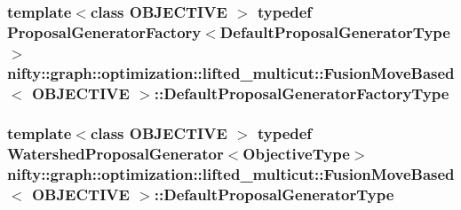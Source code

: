 \subsubsection[{Default\+Proposal\+Generator\+Factory\+Type}]{\setlength{\rightskip}{0pt plus 5cm}template$<$class O\+B\+J\+E\+C\+T\+I\+V\+E $>$ typedef {\bf Proposal\+Generator\+Factory}$<${\bf Default\+Proposal\+Generator\+Type}$>$ {\bf nifty\+::graph\+::optimization\+::lifted\+\_\+multicut\+::\+Fusion\+Move\+Based}$<$ O\+B\+J\+E\+C\+T\+I\+V\+E $>$\+::{\bf Default\+Proposal\+Generator\+Factory\+Type}}\label{classnifty_1_1graph_1_1optimization_1_1lifted__multicut_1_1FusionMoveBased_abf6ee046e4b736c29bcec411b6d71aaa}
\hypertarget{classnifty_1_1graph_1_1optimization_1_1lifted__multicut_1_1FusionMoveBased_ad26cd7774a1de503680faae6fdf0bc1f}{}
\subsubsection[{Default\+Proposal\+Generator\+Type}]{\setlength{\rightskip}{0pt plus 5cm}template$<$class O\+B\+J\+E\+C\+T\+I\+V\+E $>$ typedef {\bf Watershed\+Proposal\+Generator}$<${\bf Objective\+Type}$>$ {\bf nifty\+::graph\+::optimization\+::lifted\+\_\+multicut\+::\+Fusion\+Move\+Based}$<$ O\+B\+J\+E\+C\+T\+I\+V\+E $>$\+::{\bf Default\+Proposal\+Generator\+Type}}\label{classnifty_1_1graph_1_1optimization_1_1lifted__multicut_1_1FusionMoveBased_ad26cd7774a1de503680faae6fdf0bc1f}
\hypertarget{classnifty_1_1graph_1_1optimization_1_1lifted__multicut_1_1FusionMoveBased_af57635ef29d2ba2bb3b3494d1d5f9960}{}
